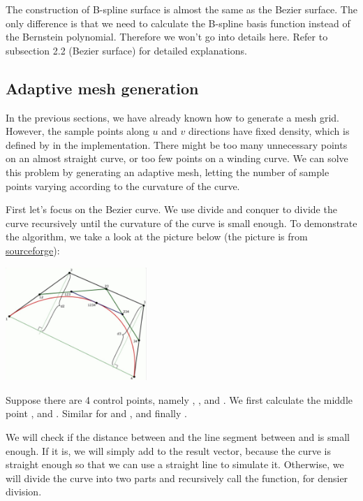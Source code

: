 \documentclass[acmtog]{acmart}
\newcommand{\code}[1]{\texttt{\color{magenta}{#1}}} %
\begin{document}
The construction of B-spline surface is almost the same as the Bezier surface. The only difference is that we need to calculate the B-spline basis function instead of the Bernstein polynomial. Therefore we won't go into details here. Refer to subsection 2.2 (Bezier surface) for detailed explanations.


\subsection{Adaptive mesh generation}

In the previous sections, we have already known how to generate a mesh grid. However, the sample points along $u$ and $v$ directions have fixed density, which is defined by \code{float DIM\_RECIPROCAL = 0.02} in the implementation. There might be too many unnecessary points on an almost straight curve, or too few points on a winding curve. We can solve this problem by generating an adaptive mesh, letting the number of sample points varying according to the curvature of the curve. 

First let's focus on the Bezier curve. We use divide and conquer to divide the curve recursively until the curvature of the curve is small enough. To demonstrate the algorithm, we take a look at the picture below (the picture is from \href{https://agg.sourceforge.net/antigrain.com/research/adaptive_bezier/index.html}{sourceforge}):

\begin{center}
	\includegraphics[width=0.4\textwidth]{./images/adaptive-bezier.jpg}
\end{center}

Suppose there are 4 control points, namely \code{p1}, \code{p2}, \code{p3} and \code{p4}. We first calculate the middle point \code{p12}, \code{p23} and \code{p34}. Similar for \code{p123} and \code{p234}, and finally \code{p1234}. 

We will check if the distance between \code{p1234} and the line segment between \code{p1} and \code{p4} is small enough. If it is, we will simply add \code{p1234} to the result vector, because the curve is straight enough so that we can use a straight line to simulate it. Otherwise, we will divide the curve into two parts and recursively call the function, for densier division.
\end{document}
